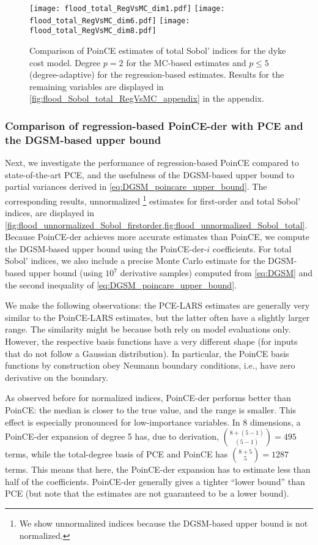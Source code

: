 \documentclass[a4paper,11pt]{article}
\theoremstyle{definition}
\theoremstyle{remark}
\theoremstyle{theorem}
\begin{document}
\begin{figure}[htbp]
	\centering
	{\texttt{[image: flood\_total\_RegVsMC\_dim1.pdf]}}
	\hfill
	{\texttt{[image: flood\_total\_RegVsMC\_dim6.pdf]}}
	\hfill
	{\texttt{[image: flood\_total\_RegVsMC\_dim8.pdf]}}
	\caption{Comparison of PoinCE estimates of {total Sobol' indices} for the dyke cost model. Degree $p = 2$ for the MC-based estimates and $p \leq 5$ (degree-adaptive) for the regression-based estimates. Results for the remaining variables are displayed in \cref{fig:flood_Sobol_total_RegVsMC_appendix} in the appendix.}
	\label{fig:flood_Sobol_total_RegVsMC}
\end{figure}


\subsubsection{Comparison of regression-based PoinCE-der with PCE and the DGSM-based upper bound}
Next, we investigate the performance of regression-based PoinCE compared to state-of-the-art PCE, and the usefulness of the DGSM-based upper bound to partial variances derived in \eqref{eq:DGSM_poincare_upper_bound}.
The corresponding results, unnormalized%
\footnote{We show unnormalized indices because the DGSM-based upper bound is not normalized.}
estimates for first-order and total Sobol' indices, are displayed in \cref{fig:flood_unnormalized_Sobol_firstorder,fig:flood_unnormalized_Sobol_total}.
Because PoinCE-der achieves more accurate estimates than PoinCE, we compute the DGSM-based upper bound using the PoinCE-der-$i$ coefficients.
For total Sobol' indices, we also include a precise Monte Carlo estimate for the DGSM-based upper bound (using $10^7$ derivative samples) computed from \eqref{eq:DGSM} and the second inequality of \eqref{eq:DGSM_poincare_upper_bound}.

We make the following observations:
the PCE-LARS estimates are generally very similar to the PoinCE-LARS estimates, but the latter often have a slightly larger range. The similarity might be because both rely on model evaluations only. However, the respective basis functions have a very different shape (for inputs that do not follow a Gaussian distribution).
In particular, the PoinCE basis functions by construction obey Neumann boundary conditions, i.e., have zero derivative on the boundary. 

As observed before for normalized indices, PoinCE-der performs better than PoinCE: the median is closer to the true value, and the range is smaller. This effect is especially pronounced for low-importance variables. In 8 dimensions, a PoinCE-der expansion of degree 5 has, due to derivation, $\binom{8+(5-1)}{(5-1)} = 495$ terms, while the total-degree basis of PCE and PoinCE has $\binom{8+5}{5} = 1287$ terms. This means that here, the PoinCE-der expansion has to estimate less than half of the coefficients.
PoinCE-der generally gives a tighter ``lower bound'' than PCE (but note that 
the estimates are not guaranteed to be a lower bound).
\end{document}
